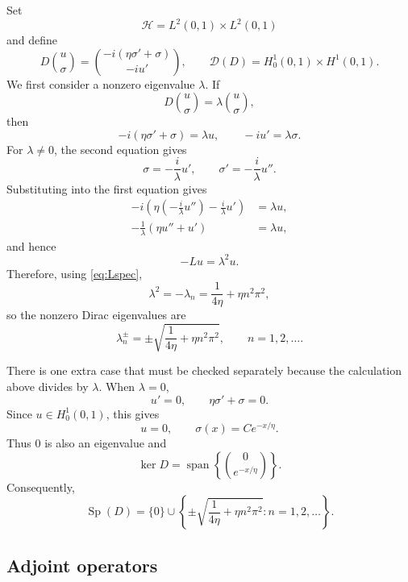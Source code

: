 \documentclass[12pt,a4paper]{article}
\newcommand{\D}{\mathcal{D}}
\newcommand{\Sp}{\operatorname{Sp}}
\begin{document}
Set
\[
    \mathcal H=L^2(0,1)\times L^2(0,1)
\]
and define
\begin{equation}
    D\binom{u}{\sigma}
    =
    \binom{-i(\eta\sigma'+\sigma)}{-iu'},
    \qquad
    \D(D)=H_0^1(0,1)\times H^1(0,1).
    \label{eq:D}
\end{equation}
We first consider a nonzero eigenvalue $\lambda$.  If
\[
    D\binom{u}{\sigma}
    =\lambda\binom{u}{\sigma},
\]
then
\begin{equation}
    -i(\eta\sigma'+\sigma)=\lambda u,
    \qquad
    -iu'=\lambda\sigma.
    \label{eq:DiracSystem}
\end{equation}
For $\lambda\neq0$, the second equation gives
\[
    \sigma=-\frac{i}{\lambda}u',
    \qquad
    \sigma'=-\frac{i}{\lambda}u''.
\]
Substituting into the first equation gives
\begin{align*}
    -i\left(\eta\left(-\frac{i}{\lambda}u''\right)
       -\frac{i}{\lambda}u'\right)
       &=\lambda u,\\
    -\frac{1}{\lambda}(\eta u''+u')
       &=\lambda u,
\end{align*}
and hence
\begin{equation}
    -Lu=\lambda^2u.
    \label{eq:DiracL}
\end{equation}
Therefore, using \eqref{eq:Lspec},
\[
    \lambda^2
    =-\lambda_n
    =\frac{1}{4\eta}+\eta n^2\pi^2,
\]
so the nonzero Dirac eigenvalues are
\begin{equation}
    \boxed{
    \lambda_n^{\pm}
    =\pm\sqrt{\frac{1}{4\eta}+\eta n^2\pi^2},
    \qquad n=1,2,\ldots.}
    \label{eq:Dspecnonzero}
\end{equation}

There is one extra case that must be checked separately because the calculation above divides by $\lambda$.  When $\lambda=0$,
\[
    u'=0,
    \qquad
    \eta\sigma'+\sigma=0.
\]
Since $u\in H_0^1(0,1)$, this gives
\[
    u=0,
    \qquad
    \sigma(x)=Ce^{-x/\eta}.
\]
Thus $0$ is also an eigenvalue and
\begin{equation}
    \ker D
    =\operatorname{span}\left\{
      \binom{0}{e^{-x/\eta}}
    \right\}.
\end{equation}
Consequently,
\begin{equation}
    \boxed{
    \Sp(D)=\{0\}\cup
    \left\{
    \pm\sqrt{\frac{1}{4\eta}+\eta n^2\pi^2}:
    n=1,2,\ldots
    \right\}.}
\end{equation}



\subsection{Adjoint operators}
\end{document}

